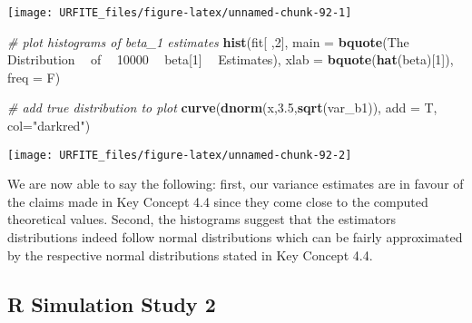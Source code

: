 \documentclass[]{book}
\newenvironment{Shaded}{\begin{snugshade}}{\end{snugshade}}
\newcommand{\KeywordTok}[1]{\textcolor[rgb]{0.13,0.29,0.53}{\textbf{#1}}}
\newcommand{\DataTypeTok}[1]{\textcolor[rgb]{0.13,0.29,0.53}{#1}}
\newcommand{\DecValTok}[1]{\textcolor[rgb]{0.00,0.00,0.81}{#1}}
\newcommand{\FloatTok}[1]{\textcolor[rgb]{0.00,0.00,0.81}{#1}}
\newcommand{\StringTok}[1]{\textcolor[rgb]{0.31,0.60,0.02}{#1}}
\newcommand{\CommentTok}[1]{\textcolor[rgb]{0.56,0.35,0.01}{\textit{#1}}}
\newcommand{\OperatorTok}[1]{\textcolor[rgb]{0.81,0.36,0.00}{\textbf{#1}}}
\newcommand{\NormalTok}[1]{#1}
\theoremstyle{definition}
\theoremstyle{definition}
\theoremstyle{definition}
\theoremstyle{remark}
\begin{document}
\begin{center}\texttt{[image: URFITE\_files/figure-latex/unnamed-chunk-92-1]} \end{center}

\begin{Shaded}
\begin{Highlighting}[]
\CommentTok{# plot histograms of beta_1 estimates}
\KeywordTok{hist}\NormalTok{(fit[ ,}\DecValTok{2}\NormalTok{], }
     \DataTypeTok{main =} \KeywordTok{bquote}\NormalTok{(The }\OperatorTok{~}\StringTok{ }\NormalTok{Distribution  }\OperatorTok{~}\StringTok{ }\NormalTok{of }\OperatorTok{~}\StringTok{ }\DecValTok{10000} \OperatorTok{~}\StringTok{ }\NormalTok{beta[}\DecValTok{1}\NormalTok{] }\OperatorTok{~}\StringTok{ }\NormalTok{Estimates), }
     \DataTypeTok{xlab =} \KeywordTok{bquote}\NormalTok{(}\KeywordTok{hat}\NormalTok{(beta)[}\DecValTok{1}\NormalTok{]), }
     \DataTypeTok{freq =}\NormalTok{ F)}

\CommentTok{# add true distribution to plot}
\KeywordTok{curve}\NormalTok{(}\KeywordTok{dnorm}\NormalTok{(x,}\FloatTok{3.5}\NormalTok{,}\KeywordTok{sqrt}\NormalTok{(var_b1)), }\DataTypeTok{add =}\NormalTok{ T, }\DataTypeTok{col=}\StringTok{"darkred"}\NormalTok{)}
\end{Highlighting}
\end{Shaded}

\begin{center}\texttt{[image: URFITE\_files/figure-latex/unnamed-chunk-92-2]} \end{center}

We are now able to say the following: first, our variance estimates are
in favour of the claims made in Key Concept 4.4 since they come close to
the computed theoretical values. Second, the histograms suggest that the
estimators distributions indeed follow normal distributions which can be
fairly approximated by the respective normal distributions stated in Key
Concept 4.4.

\subsection*{R Simulation Study 2}\label{r-simulation-study-2}
\end{document}
